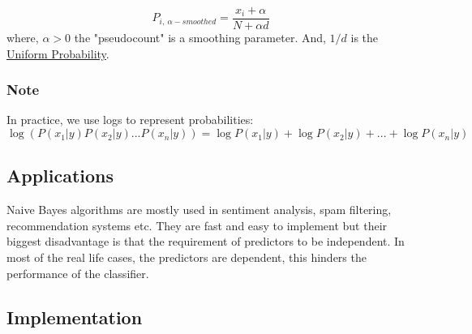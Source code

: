 \documentclass[12pt, A4]{report}
\begin{document}
	\begin{equation}
		P_{i,\ \alpha-smoothed} = \frac{x_i+\alpha}{N+\alpha d}
	\end{equation}
	where, $\alpha > 0$ the "pseudocount" is a smoothing parameter. And, $1/d$ is the \href{https://en.wikipedia.org/wiki/Discrete_uniform_distribution}{Uniform Probability}.

	\subsubsection*{Note}
	In practice, we use logs to represent probabilities:
	\begin{equation}
		\log{(P(x_1|y)P(x_2|y)...P(x_n|y))} = \log{P(x_1|y)} + \log{P(x_2|y)} +...+ \log{P(x_n|y)}
	\end{equation}


\subsection*{Applications}
	Naive Bayes algorithms are mostly used in sentiment analysis, spam filtering, recommendation systems etc. They are fast and easy to implement but their biggest disadvantage is that the requirement of predictors to be independent. In most of the real life cases, the predictors are dependent, this hinders the performance of the classifier.

\subsection*{Implementation}

\end{document}
